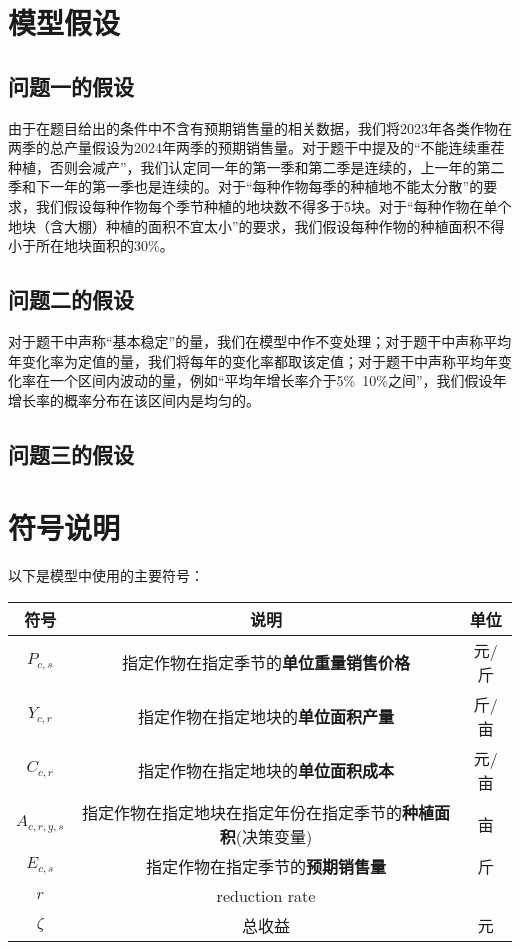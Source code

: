 \documentclass{cumcmthesis}
\begin{document}
\section{模型假设}
\subsection{问题一的假设}
由于在题目给出的条件中不含有预期销售量的相关数据，我们将2023年各类作物在两季的总产量假设为2024年两季的预期销售量。对于题干中提及的“不能连续重茬种植，否则会减产”，我们认定同一年的第一季和第二季是连续的，上一年的第二季和下一年的第一季也是连续的。对于“每种作物每季的种植地不能太分散”的要求，我们假设每种作物每个季节种植的地块数不得多于5块。对于“每种作物在单个地块（含大棚）种植的面积不宜太小”的要求，我们假设每种作物的种植面积不得小于所在地块面积的30\%。
\subsection{问题二的假设}
对于题干中声称“基本稳定”的量，我们在模型中作不变处理；对于题干中声称平均年变化率为定值的量，我们将每年的变化率都取该定值；对于题干中声称平均年变化率在一个区间内波动的量，例如“平均年增长率介于5\%~10\%之间”，我们假设年增长率的概率分布在该区间内是均匀的。
\subsection{问题三的假设}


\section{符号说明}
以下是模型中使用的主要符号：
\begin{table}[!htbp]
    \begin{tabular}{ccc}
        \toprule[1.5pt]
        符号 & 说明 & 单位\\
        \midrule[1pt]
        $P_{c,s}$ & 指定作物在指定季节的\textbf{单位重量销售价格} & 元/斤 \\
        $Y_{c,r}$ & 指定作物在指定地块的\textbf{单位面积产量} & 斤/亩\\
        $C_{c,r}$ & 指定作物在指定地块的\textbf{单位面积成本} & 元/亩\\
        $A_{c,r,y,s}$ & 指定作物在指定地块在指定年份在指定季节的\textbf{种植面积}(决策变量) & 亩\\
        $E_{c,s}$ & 指定作物在指定季节的\textbf{预期销售量} & 斤\\
        $r$ & reduction rate & \\
        
        $\zeta$ & 总收益 & 元\\
        \bottomrule[1.5pt]
    \end{tabular}
\end{table}
\end{document}
